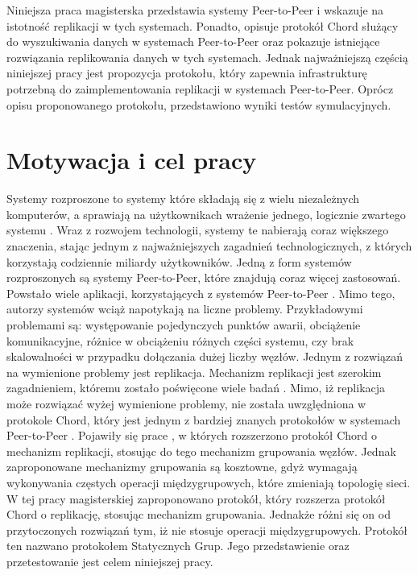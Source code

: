 \documentclass[12pt, twoside, openany]{report}
\begin{document}

Niniejsza praca magisterska przedstawia systemy Peer-to-Peer i wskazuje na istotność replikacji w tych systemach. Ponadto, opisuje protokół Chord służący do wyszukiwania danych w systemach Peer-to-Peer oraz pokazuje istniejące rozwiązania replikowania danych w tych systemach. Jednak najważniejszą częścią niniejszej pracy jest propozycja protokołu, który zapewnia infrastrukturę potrzebną do zaimplementowania replikacji w systemach Peer-to-Peer. Oprócz opisu proponowanego protokołu, przedstawiono wyniki testów symulacyjnych.

\section{Motywacja i cel pracy}

Systemy rozproszone to systemy które składają się z wielu niezależnych komputerów, a sprawiają na użytkownikach wrażenie jednego, logicznie zwartego systemu \cite{bib:kobusinska}. Wraz z rozwojem technologii, systemy te nabierają coraz większego znaczenia, stając jednym z najważniejszych zagadnień technologicznych, z których  korzystają codziennie miliardy użytkowników. Jedną z form systemów rozproszonych są systemy Peer-to-Peer, które znajdują coraz więcej zastosowań. Powstało wiele aplikacji, korzystających z systemów Peer-to-Peer \cite{bib:gnutella, bib:kazaa, bib:freehaven, bib:pastry, bib:pier, bib:edutella, bib:jxta}. Mimo tego, autorzy systemów wciąż napotykają na liczne problemy. Przykładowymi problemami \cite{bib:martins} są: występowanie pojedynczych punktów awarii, obciążenie komunikacyjne, różnice w obciążeniu różnych części systemu, czy brak skalowalności w przypadku dołączania dużej liczby węzłów. Jednym z rozwiązań na wymienione problemy jest replikacja. Mechanizm replikacji jest szerokim zagadnieniem, któremu zostało poświęcone wiele badań \cite{bib:martins, bib:jeyasheeli, bib:ye, bib:paiva, bib:scatter, bib:rollerchain}. Mimo, iż replikacja może rozwiązać wyżej wymienione problemy, nie została uwzględniona w protokole Chord, który jest jednym z bardziej znanych protokołów w systemach Peer-to-Peer \cite{bib:paiva}. Pojawiły się prace \cite{bib:scatter, bib:rollerchain}, w których rozszerzono protokół Chord o mechanizm replikacji, stosując do tego mechanizm grupowania węzłów. Jednak zaproponowane mechanizmy grupowania są kosztowne, gdyż wymagają wykonywania częstych operacji międzygrupowych, które zmieniają topologię sieci. W tej pracy magisterskiej zaproponowano protokół, który rozszerza protokół Chord o replikację, stosując mechanizm grupowania. Jednakże różni się on od przytoczonych rozwiązań tym, iż nie stosuje operacji międzygrupowych. Protokół ten nazwano protokołem Statycznych Grup. Jego przedstawienie oraz przetestowanie jest celem niniejszej pracy.
\end{document}

